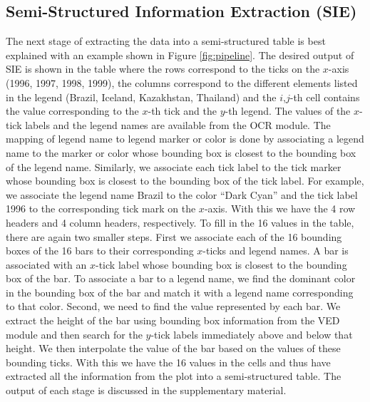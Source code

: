 \documentclass[10pt,twocolumn,letterpaper]{article}
\begin{document}
\subsection{Semi-Structured Information Extraction (SIE)}
The next stage of extracting the data into a semi-structured table is best explained with an example shown in Figure \ref{fig:pipeline}.
The desired output of SIE is shown in the table where the rows correspond to the ticks on the $x$-axis (1996, 1997, 1998, 1999), the columns correspond to the different elements listed in the legend (Brazil, Iceland, Kazakhstan, Thailand) and the $i$,$j$-th cell contains the value corresponding to the $x$-th tick and the $y$-th legend. 
The values of the $x$-tick labels and the legend names are available from the OCR module. 
The mapping of legend name to legend marker or color is done by associating a legend name to the marker or color whose bounding box is closest to the bounding box of the legend name.
Similarly, we associate each tick label to the tick marker whose bounding box is closest to the bounding box of the tick label. 
For example, we associate the legend name Brazil to the color ``Dark Cyan'' and the tick label 1996 to the corresponding tick mark on the $x$-axis. 
With this we have the 4 row headers and 4 column headers, respectively.
To fill in the 16 values in the table, there are again two smaller steps. 
First we associate each of the 16 bounding boxes of the 16 bars to their corresponding $x$-ticks and legend names. 
A bar is associated with an $x$-tick label whose bounding box is closest to the bounding box of the bar. 
To associate a bar to a legend name, we find the dominant color in the bounding box of the bar and match it with a legend name corresponding to that color.
Second, we need to find the value represented by each bar. 
We extract the height of the bar using bounding box information from the VED module and then search for the $y$-tick labels immediately above and below that height. 
We then interpolate the value of the bar based on the values of these bounding ticks.
With this we have the 16 values in the cells and thus have extracted all the information from the plot into a semi-structured table. The output of each stage  is discussed in the supplementary material.
\end{document}
